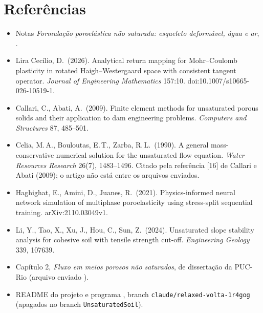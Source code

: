 \documentclass[11pt,a4paper]{article}
\numberwithin{equation}{section}
\newcommand{\code}[1]{\texttt{#1}}
\begin{document}
\section*{Referências}
\begin{itemize}
\item[{[N]}] Notas \emph{Formulação poroelástica não saturada: esqueleto deformável, água e ar},
.
\item[{[A]}] Lira Cecílio, D.\ (2026). Analytical return mapping for Mohr--Coulomb plasticity in rotated
Haigh--Westergaard space with consistent tangent operator. \emph{Journal of Engineering Mathematics} 157:10. doi:10.1007/s10665-026-10519-1.
\item Callari, C., Abati, A.\ (2009). Finite element methods for unsaturated porous solids and their application to dam
engineering problems. \emph{Computers and Structures} 87, 485--501.
\item Celia, M.\,A., Bouloutas, E.\,T., Zarba, R.\,L.\ (1990). A general mass-conservative numerical solution for the
unsaturated flow equation. \emph{Water Resources Research} 26(7), 1483--1496. Citado pela referência [16] de Callari e
Abati (2009); o artigo não está entre os arquivos enviados.
\item Haghighat, E., Amini, D., Juanes, R.\ (2021). Physics-informed neural network simulation of multiphase
poroelasticity using stress-split sequential training. arXiv:2110.03049v1.
\item Li, Y., Tao, X., Xu, J., Hou, C., Sun, Z.\ (2024). Unsaturated slope stability analysis for cohesive soil with
tensile strength cut-off. \emph{Engineering Geology} 339, 107639.
\item Capítulo 2, \emph{Fluxo em meios porosos não saturados}, de dissertação da PUC-Rio (arquivo enviado
).
\item README do projeto  e programa , branch
\code{claude/relaxed-volta-1r4gog} (apagados no branch \code{UnsaturatedSoil}).
\end{itemize}
\end{document}
